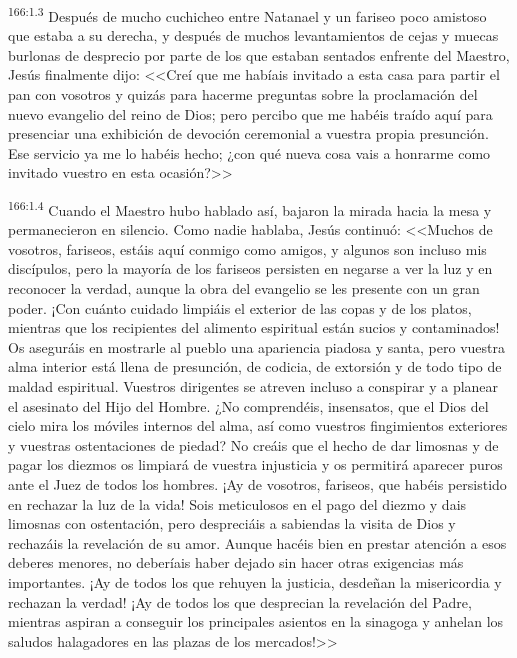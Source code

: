 \par 
\textsuperscript{166:1.3} Después de mucho cuchicheo entre Natanael y un fariseo poco amistoso que estaba a su derecha, y después de muchos levantamientos de cejas y muecas burlonas de desprecio por parte de los que estaban sentados enfrente del Maestro, Jesús finalmente dijo: <<Creí que me habíais invitado a esta casa para partir el pan con vosotros y quizás para hacerme preguntas sobre la proclamación del nuevo evangelio del reino de Dios; pero percibo que me habéis traído aquí para presenciar una exhibición de devoción ceremonial a vuestra propia presunción. Ese servicio ya me lo habéis hecho; ¿con qué nueva cosa vais a honrarme como invitado vuestro en esta ocasión?>>

\par 
\textsuperscript{166:1.4} Cuando el Maestro hubo hablado así, bajaron la mirada hacia la mesa y permanecieron en silencio. Como nadie hablaba, Jesús continuó: <<Muchos de vosotros, fariseos, estáis aquí conmigo como amigos, y algunos son incluso mis discípulos, pero la mayoría de los fariseos persisten en negarse a ver la luz y en reconocer la verdad, aunque la obra del evangelio se les presente con un gran poder. ¡Con cuánto cuidado limpiáis el exterior de las copas y de los platos, mientras que los recipientes del alimento espiritual están sucios y contaminados! Os aseguráis en mostrarle al pueblo una apariencia piadosa y santa, pero vuestra alma interior está llena de presunción, de codicia, de extorsión y de todo tipo de maldad espiritual. Vuestros dirigentes se atreven incluso a conspirar y a planear el asesinato del Hijo del Hombre. ¿No comprendéis, insensatos, que el Dios del cielo mira los móviles internos del alma, así como vuestros fingimientos exteriores y vuestras ostentaciones de piedad? No creáis que el hecho de dar limosnas y de pagar los diezmos os limpiará de vuestra injusticia y os permitirá aparecer puros ante el Juez de todos los hombres. ¡Ay de vosotros, fariseos, que habéis persistido en rechazar la luz de la vida! Sois meticulosos en el pago del diezmo y dais limosnas con ostentación, pero despreciáis a sabiendas la visita de Dios y rechazáis la revelación de su amor. Aunque hacéis bien en prestar atención a esos deberes menores, no deberíais haber dejado sin hacer otras exigencias más importantes. ¡Ay de todos los que rehuyen la justicia, desdeñan la misericordia y rechazan la verdad! ¡Ay de todos los que desprecian la revelación del Padre, mientras aspiran a conseguir los principales asientos en la sinagoga y anhelan los saludos halagadores en las plazas de los mercados!>>


